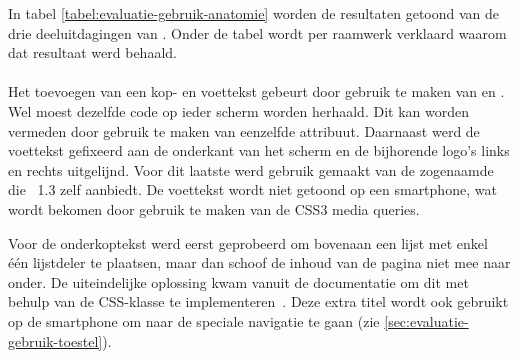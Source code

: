 In tabel \ref{tabel:evaluatie-gebruik-anatomie} worden de resultaten getoond van de drie deeluitdagingen van .
Onder de tabel wordt per raamwerk verklaard waarom dat resultaat werd behaald.

\begin{table}[H]
\centering
{}
\caption{Gebruik van  voor \st{}~(\sta), \kendo{}~(\kendoa), \jqm{}~(\jqma) en \lungo{}~(\lungoa).}
\label{tabel:evaluatie-gebruik-anatomie}
\end{table}

\paragraph{\jqm}
Het toevoegen van een kop- en voettekst gebeurt door gebruik te maken van  en . 
Wel moest dezelfde code op ieder scherm worden herhaald. 
Dit kan worden vermeden door gebruik te maken van eenzelfde  attribuut. 
Daarnaast werd de voettekst gefixeerd aan de onderkant van het scherm en de bijhorende logo's links en rechts uitgelijnd. 
Voor dit laatste werd gebruik gemaakt van de zogenaamde  die \jqm{}~1.3 zelf aanbiedt. 
De voettekst wordt niet getoond op een smartphone, wat wordt bekomen door gebruik te maken van de CSS3 media queries.

Voor de onderkoptekst werd eerst geprobeerd om bovenaan een lijst met enkel één lijstdeler te plaatsen, maar dan schoof de inhoud van de pagina niet mee naar onder. 
De uiteindelijke oplossing kwam vanuit de documentatie om dit met behulp van de CSS-klasse  te implementeren~\cite{JQuery2013b}. 
Deze extra titel wordt ook gebruikt op de smartphone om naar de speciale navigatie te gaan (zie \ref{sec:evaluatie-gebruik-toestel}).

